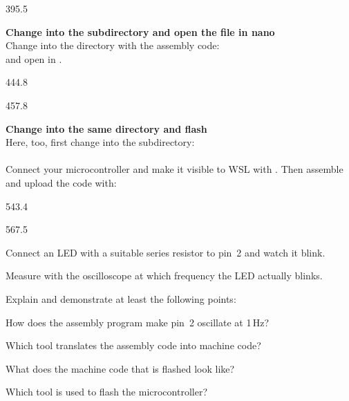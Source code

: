 \documentclass{aslab}
\begin{document}
\begin{region}[pitch=12.15]{395.5}
\begin{alphatasks}[start=2]
\item \textbf{Change into the subdirectory and open the file in nano}\\
  Change into the directory with the assembly code:\\
   and open  in
  .
\end{alphatasks}
\end{region}

\begin{region}{444.8}
\end{region}

\begin{region}[pitch=12.2]{457.8}
\begin{alphatasks}
\item \textbf{Change into the same directory and flash}\\
  Here, too, first change into the subdirectory:\\
  \\
  Connect your microcontroller and make it visible to WSL with
  . Then assemble and upload the code with:\\
\end{alphatasks}
\end{region}

\begin{region}{543.4}
\end{region}

\begin{region}{567.5}
\begin{numlist}
\item Connect an LED with a suitable series resistor to pin~2 and watch it
  blink.
\item Measure with the oscilloscope at which frequency the LED actually
  blinks.
\item Explain and demonstrate at least the following points:
  \begin{steps}
  \item How does the assembly program make pin~2 oscillate at 1\,Hz?
  \item Which tool translates the assembly code into machine code?
  \item What does the machine code that is flashed look like?
  \item Which tool is used to flash the microcontroller?
  \end{steps}
\end{numlist}
\end{region}
\end{document}
